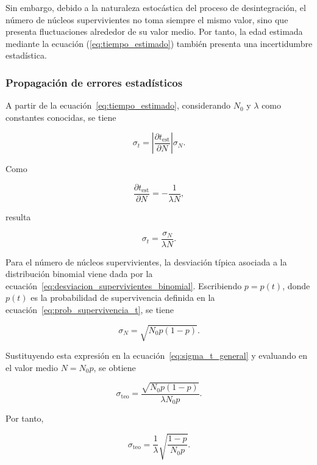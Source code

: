 \documentclass[12pt,a4paper]{article}
\begin{document}
Sin embargo, debido a la naturaleza estocástica del proceso de desintegración, el número de núcleos supervivientes no toma siempre el mismo valor, sino que presenta fluctuaciones alrededor de su valor medio. Por tanto, la edad estimada mediante la ecuación (\ref{eq:tiempo_estimado}) también presenta una incertidumbre estadística.

\subsubsection{Propagación de errores estadísticos}
\label{sec:propagacion_errores_estadisticos}

A partir de la ecuación~\eqref{eq:tiempo_estimado}, considerando $N_0$ y $\lambda$ como constantes conocidas, se tiene

\begin{equation}
\sigma_t =
\left|
\frac{\partial t_{\mathrm{est}}}{\partial N}
\right|
\sigma_N.
\end{equation}

Como

\begin{equation}
\frac{\partial t_{\mathrm{est}}}{\partial N}
=
-\frac{1}{\lambda N},
\end{equation}

resulta

\begin{equation}
\sigma_t =
\frac{\sigma_N}{\lambda N}.
\label{eq:sigma_t_general}
\end{equation}

Para el número de núcleos supervivientes, la desviación típica asociada a la distribución binomial viene dada por la ecuación~\eqref{eq:desviacion_supervivientes_binomial}. Escribiendo $p=p(t)$, donde $p(t)$ es la probabilidad de supervivencia definida en la ecuación~\eqref{eq:prob_supervivencia_t}, se tiene

\begin{equation}
\sigma_N=\sqrt{N_0p(1-p)}.
\end{equation}

Sustituyendo esta expresión en la ecuación~\eqref{eq:sigma_t_general} y evaluando en el valor medio $N=N_0p$, se obtiene

\begin{equation}
\sigma_{\mathrm{teo}}=
\frac{\sqrt{N_0p(1-p)}}{\lambda N_0p}.
\end{equation}

Por tanto,

\begin{equation}
\sigma_{\mathrm{teo}}=
\frac{1}{\lambda}
\sqrt{
\frac{1-p}{N_0p}
}.
\end{equation}
\end{document}

